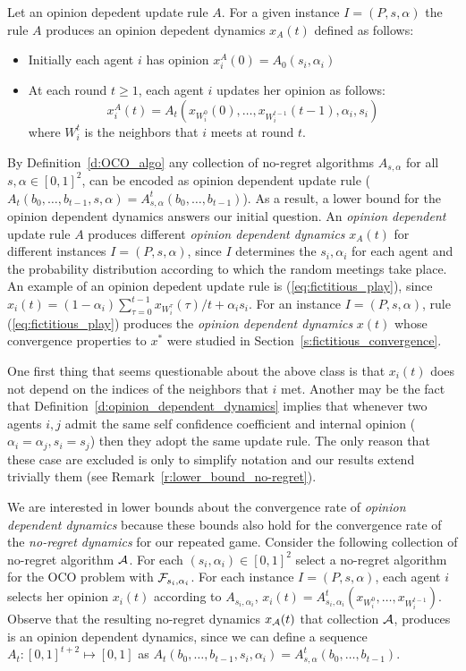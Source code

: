 \begin{definition}\label{d:opinion_dependent_dynamics}
Let an opinion depedent update rule $A$. For a given instance $I=(P,s,\alpha)$
the rule $A$ produces an opinion depedent dynamics $x_A(t)$ defined as follows:
\begin{itemize}
 \item Initially each agent $i$ has opinion $x_i^A(0)=A_0(s_i,\alpha_i)$
 \item At each round $t\geq 1$, each agent $i$ updates her opinion as follows:
 \[x_i^A(t)=A_t(x_{W_i^0}(0),\dots,x_{W_i^{t-1}}(t-1),\alpha_i,s_i)\]
where $W_i^t$ is the neighbors that $i$ meets at round $t$.
\end{itemize}
\end{definition}
By Definition~\ref{d:OCO_algo} any collection of no-regret algorithms
$A_{s,\alpha}$ for all $s,\alpha \in [0,1]^2$, can be encoded as opinion dependent
update rule ($A_t(b_0,\ldots,b_{t-1},s,\alpha)=A_{s,\alpha}^t(b_0,\dots,b_{t-1})$).
As a result, a lower bound for the opinion dependent dynamics 
answers our initial question. An \emph{opinion dependent} update rule $A$
produces different \emph{opinion dependent dynamics} $x_A(t)$
for different instances $I=(P,s,\alpha)$, since $I$ determines
the $s_i,\alpha_i$ for each agent and the probability distribution
according to which the random meetings take place. 
An example of an opinion depedent update rule is
(\ref{eq:fictitious_play}), since $x_i(t) = (1-\alpha_i)\sum_{\tau=0}^{t-1}x_{W_i^\tau}(\tau)/t 
+ \alpha_is_i$. For an instance $I=(P,s,\alpha)$, rule (\ref{eq:fictitious_play}) produces the 
\emph{opinion dependent dynamics} $x(t)$ whose convergence properties 
to $x^*$ were studied in Section~\ref{s:fictitious_convergence}. 

One first thing that seems questionable about the above class is that
$x_i(t)$ does not depend on the indices of the neighbors that $i$ met. Another
may be the fact that Definition~\ref{d:opinion_dependent_dynamics}
implies that whenever two agents $i,j$ admit the same self confidence coefficient
and internal opinion ($\alpha_i=\alpha_j,s_i=s_j$) then they adopt the same update rule.
The only reason that these case are excluded is only to simplify notation and our
results extend trivially them (see Remark~\ref{r:lower_bound_no-regret}).

We are interested in lower bounds about the convergence rate of
\emph{opinion dependent dynamics} because these bounds also hold
for the convergence rate of the \emph{no-regret dynamics} for our repeated game.
Consider the following collection of no-regret algorithm $\mathcal{A}$.
For each $(s_i,\alpha_i) \in [0,1]^2$ select a no-regret algorithm 
for the OCO problem with $\mathcal{F}_{s_i,\alpha_i}$.
For each instance $I=(P,s,\alpha)$, each agent $i$ selects
her opinion $x_i(t)$ according to $A_{s_i,\alpha_i}$, 
$x_i(t)=A_{s_i,\alpha_i}^t(x_{W_i^0},\ldots,x_{W_i^{t-1}})$.
Observe that the resulting no-regret dynamics $x_{\mathcal{A}}(t)$
that collection $\mathcal{A}$, produces is an opinion dependent dynamics, 
since we can define a sequence $A_t:[0,1]^{t+2} \mapsto [0,1]$ as
$A_t(b_0,\ldots,b_{t-1},s_i,\alpha_i)=A^t_{s,\alpha}(b_0,\ldots,b_{t-1})$.

